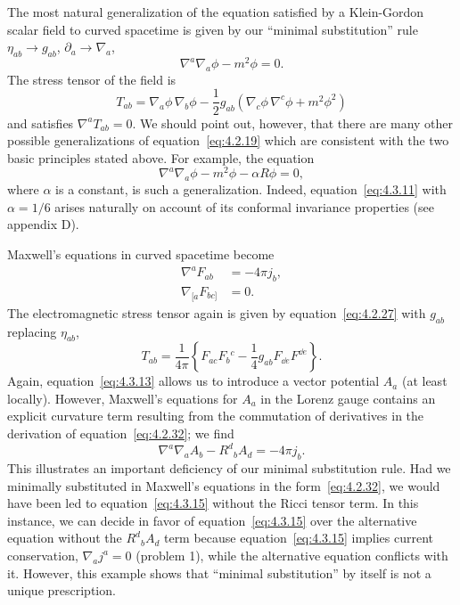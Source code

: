 The most natural generalization of the equation satisfied by a Klein-Gordon scalar
field to curved spacetime is given by our \textquotedblleft minimal
substitution\textquotedblright{} rule
\(\eta_{ab}\longrightarrow g_{ab}\), \(\partial_a\longrightarrow\nabla_a\),
\begin{equation}
  \nabla^a\nabla_a\phi-m^2\phi=0 .
  \tag{4.3.9}\label{eq:4.3.9}
\end{equation}
The stress tensor of the field is
\begin{equation}
  T_{ab}=\nabla_a\phi\,\nabla_b\phi
  -\frac12g_{ab}\left(\nabla_c\phi\,\nabla^c\phi+m^2\phi^2\right)
  \tag{4.3.10}\label{eq:4.3.10}
\end{equation}
and satisfies \(\nabla^aT_{ab}=0\). We should point out, however, that there
are many other possible generalizations of equation~\eqref{eq:4.2.19} which
are consistent with the two basic principles stated above. For example, the
equation
\begin{equation}
  \nabla^a\nabla_a\phi-m^2\phi-\alpha R\phi=0 ,
  \tag{4.3.11}\label{eq:4.3.11}
\end{equation}
where \(\alpha\) is a constant, is such a generalization. Indeed,
equation~\eqref{eq:4.3.11} with \(\alpha=1/6\) arises naturally on account of
its conformal invariance properties (see appendix D).

Maxwell's equations in curved spacetime become
\begin{align}
  \nabla^aF_{ab}&=-4\pi j_b ,
    \tag{4.3.12}\label{eq:4.3.12}\\
  \nabla_{[a}F_{bc]}&=0 .
    \tag{4.3.13}\label{eq:4.3.13}
\end{align}
The electromagnetic stress tensor again is given by
equation~\eqref{eq:4.2.27} with \(g_{ab}\) replacing \(\eta_{ab}\),
\begin{equation}
  T_{ab}=\frac{1}{4\pi}\left\{
  F_{ac}F_b{}^c-\frac14g_{ab}F_{\dd e}F^{\dd e}\right\} .
  \tag{4.3.14}\label{eq:4.3.14}
\end{equation}
Again, equation~\eqref{eq:4.3.13} allows us to introduce a vector potential
\(A_a\) (at least locally). However, Maxwell's equations for \(A_a\) in the
Lorenz gauge contains an explicit curvature term resulting from the commutation
of derivatives in the derivation of equation~\eqref{eq:4.2.32}; we find
\begin{equation}
  \nabla^a\nabla_aA_b-R^d{}_bA_d=-4\pi j_b .
  \tag{4.3.15}\label{eq:4.3.15}
\end{equation}
This illustrates an important deficiency of our minimal substitution rule. Had we
minimally substituted in Maxwell's equations in the form~\eqref{eq:4.2.32},
we would have been led to equation~\eqref{eq:4.3.15} without the Ricci tensor
term. In this instance, we can decide in favor of equation~\eqref{eq:4.3.15}
over the alternative equation without the \(R^d{}_bA_d\) term because
equation~\eqref{eq:4.3.15} implies current conservation,
\(\nabla_aj^a=0\) (problem 1), while the alternative equation conflicts with it.
However, this example shows that \textquotedblleft minimal
substitution\textquotedblright{} by itself is not a unique prescription.

